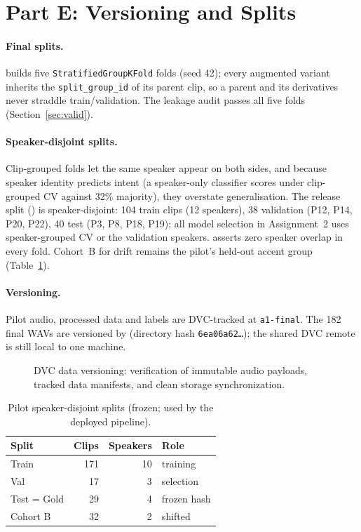 \documentclass[sigconf,authordraft]{acmart}
\begin{document}
\section{Part E: Versioning and Splits}\label{sec:split}
\paragraph{Final splits.}
 builds five \texttt{StratifiedGroupKFold} folds (seed 42); every augmented variant inherits the \texttt{split\_group\_id} of its parent clip, so a parent and its derivatives never straddle train/validation. The leakage audit passes all five folds (Section~\ref{sec:valid}).
\paragraph{Speaker-disjoint splits.}
Clip-grouped folds let the same speaker appear on both sides, and because speaker identity predicts intent (a speaker-only classifier scores \SpkShortcut{} under clip-grouped CV against 32\% majority), they overstate generalisation. The release split () is speaker-disjoint: 104 train clips (12 speakers), 38 validation (P12, P14, P20, P22), 40 test (P3, P8, P18, P19); all model selection in Assignment~2 uses speaker-grouped CV or the validation speakers.  asserts zero speaker overlap in every fold. Cohort~B for drift remains the pilot's held-out accent group (Table~\ref{tab:split}).
\paragraph{Versioning.}
Pilot audio, processed data and labels are DVC-tracked at \texttt{a1-final}. The 182 final WAVs are versioned by  (directory hash \texttt{6ea06a62\ldots}); the shared DVC remote is still local to one machine.
\begin{figure}[!htbp]
\centering
{}
\caption{DVC data versioning: verification of immutable audio payloads, tracked data manifests, and clean storage synchronization.}
\label{fig:dvc_shot}
\end{figure}
\FloatBarrier
\begin{table}[htbp]
\caption{Pilot speaker-disjoint splits (frozen; used by the deployed pipeline).}\label{tab:split}
\begin{tabular}{lrrl}
\toprule Split & Clips & Speakers & Role \\ \midrule
Train & 171 & 10 & training \\ Val & 17 & 3 & selection \\ Test = Gold & 29 & 4 & frozen hash \\ Cohort B & 32 & 2 & shifted \\ \bottomrule
\end{tabular}
\end{table}
\end{document}
